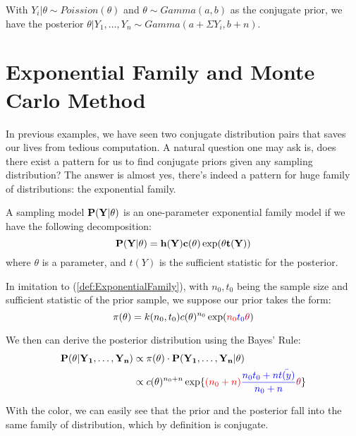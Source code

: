 \begin{proposition}\label{prop:PoissionGamma_Conjugate_Prior}
    With $Y_i|\theta \sim Poission(\theta)$ and $\theta \sim Gamma(a,b)$ as the conjugate prior, we have the posterior $\theta | Y_1, \ldots, Y_n \sim Gamma(a + \Sigma Y_i, b + n)$.
\end{proposition}


\section{Exponential Family and Monte Carlo Method}
In previous examples, we have seen two conjugate distribution pairs that saves our lives from tedious computation. A natural question one may ask is, does there exist a pattern for us to find conjugate priors given any sampling distribution? The answer is almost yes, there's indeed a pattern for huge family of distributions: the exponential family.

\begin{definition}
    A sampling model $\bf{P}(Y|\theta)$ is an one-parameter exponential family model if we have the following decomposition:
    \begin{equation}\label{def:ExponentialFamily}
        \bf{P}(Y|\theta) = h(Y)c(\theta)\exp(\theta t(Y))
    \end{equation}
    where $\theta$ is a parameter, and $t(Y)$ is the sufficient statistic for the posterior.
\end{definition}

In imitation to (\ref{def:ExponentialFamily}), with $n_0, t_0$ being the sample size and sufficient statistic of the prior sample, we suppose our prior takes the form:
\begin{equation*}
    \pi(\theta) = k(n_0, t_0)c(\theta)^{n_0}\exp(\textcolor{red}{n_0}\textcolor{blue}{t_0}\textcolor{purple}{\theta})
\end{equation*}

We then can derive the posterior distribution using the Bayes' Rule:
\begin{align*}
    \bf{P}(\theta | Y_1, \ldots, Y_n) &\propto \pi(\theta) \cdot \bf{P}(Y_1, \ldots, Y_n | \theta) \\
    &\propto c(\theta)^{n_0+n}\exp\{ \textcolor{red}{(n_0 + n)} \textcolor{blue}{\frac{n_0t_0 + n\bar{t(y)}}{n_0 + n}}\textcolor{purple}{\theta} \}
\end{align*}

With the color, we can easily see that the prior and the posterior fall into the same family of distribution, which by definition is conjugate.

